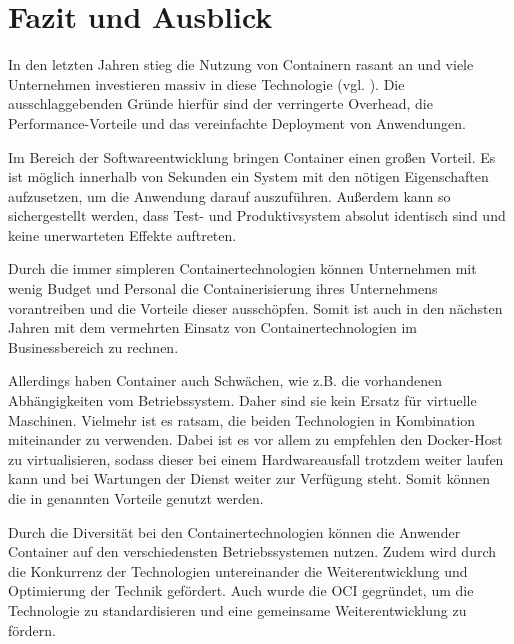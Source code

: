 \newpage
\section{Fazit und Ausblick} 
\label{sec:Fazit}
In den letzten Jahren stieg die Nutzung von Containern rasant an und viele Unternehmen investieren massiv in diese Technologie (vgl. ). 
Die ausschlaggebenden Gründe hierfür sind der verringerte Overhead, die Performance-Vorteile und das vereinfachte Deployment von Anwendungen. 

Im Bereich der Softwareentwicklung bringen Container einen großen Vorteil. 
Es ist möglich innerhalb von Sekunden ein System mit den nötigen Eigenschaften aufzusetzen, um die Anwendung darauf auszuführen. 
Außerdem kann so sichergestellt werden, dass Test- und Produktivsystem absolut identisch sind und keine unerwarteten Effekte auftreten. 

Durch die immer simpleren Containertechnologien können Unternehmen mit wenig Budget und Personal die Containerisierung ihres Unternehmens vorantreiben und die Vorteile dieser ausschöpfen. 
Somit ist auch in den nächsten Jahren mit dem vermehrten Einsatz von Containertechnologien im Businessbereich zu rechnen. 

Allerdings haben Container auch Schwächen, wie z.B. die vorhandenen Abhängigkeiten vom Betriebssystem.
Daher sind sie kein Ersatz für virtuelle Maschinen. Vielmehr ist es ratsam, die beiden Technologien in Kombination miteinander zu verwenden. 
Dabei ist es vor allem zu empfehlen den Docker-Host zu virtualisieren, sodass dieser bei einem Hardwareausfall trotzdem weiter laufen kann und bei Wartungen der Dienst weiter zur Verfügung steht. 
Somit können die in  genannten Vorteile genutzt werden.

Durch die Diversität bei den Containertechnologien können die Anwender Container auf den verschiedensten Betriebssystemen nutzen.
Zudem wird durch die Konkurrenz der Technologien untereinander die Weiterentwicklung und Optimierung der Technik gefördert. 
Auch wurde die \ac{OCI} gegründet, um die Technologie zu standardisieren und eine gemeinsame Weiterentwicklung zu fördern.

